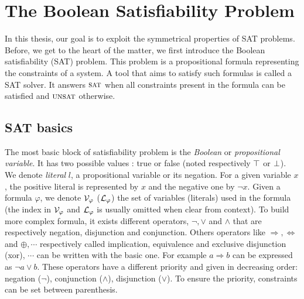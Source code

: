\chapter{The Boolean Satisfiability Problem}\label{chap:preliminaries}
\minitoc
In this thesis, our goal is to exploit the symmetrical properties of SAT problems.
Before, we get to the heart of the matter, we first introduce the Boolean satisfiability (SAT)  problem.
This problem is a propositional formula representing the constraints of a system.
A tool that aims to satisfy such formulas is called a SAT solver. It answers $\textsc{sat}$ when all constraints
present in the formula can be satisfied and $\textsc{unsat}$ otherwise.


\section{SAT basics}
The most basic block of satisfiability problem is the \emph{Boolean} or \emph{propositional variable}.
It has two possible values : true or false (noted respectively $\top$ or $\bot$).
We denote \emph{literal} $l$, a propositional variable or its negation.
For a given variable $x$, the positive literal is represented by $x$ and the negative one by $\neg x$.
Given a formula $\varphi$, we denote $\mathcal{V}_\varphi$ ($\mathcal{L}_\varphi$) the set of variables (literals) used in the formula (the index in $\mathcal{V}_\varphi$ and $\mathcal{L}_\varphi$ is usually omitted when
clear from context).
To build more complex formula, it exists different operators, $\neg, \lor$ and $\land$ that are respectively negation, disjunction and conjunction. Others operators like $\Rightarrow, \Leftrightarrow$ and
$\oplus, \cdots$ respectively called implication, equivalence and exclusive disjunction (xor), $\cdots$ can be written with the basic one.
For example $a \Rightarrow b$ can be expressed as $ \neg a \lor b$.
These operators have a different priority and given in decreasing order:
negation ($\neg$), conjunction ($\land$), disjunction ($\lor$). To ensure
the priority, constraints can be set between parenthesis.

